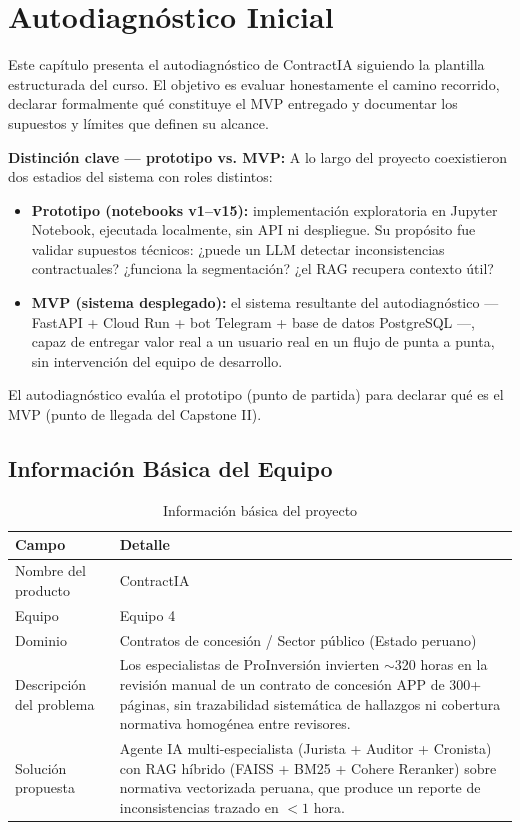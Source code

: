 \chapter{Autodiagnóstico Inicial}

Este capítulo presenta el autodiagnóstico de ContractIA siguiendo la plantilla
estructurada del curso. El objetivo es evaluar honestamente el camino recorrido,
declarar formalmente qué constituye el MVP entregado y documentar los supuestos
y límites que definen su alcance.

\medskip
\noindent\textbf{Distinción clave — prototipo vs. MVP:}
A lo largo del proyecto coexistieron dos estadios del sistema con roles distintos:

\begin{itemize}
    \item \textbf{Prototipo (notebooks v1–v15):} implementación exploratoria en
    Jupyter Notebook, ejecutada localmente, sin API ni despliegue. Su propósito
    fue validar supuestos técnicos: ¿puede un LLM detectar inconsistencias
    contractuales? ¿funciona la segmentación? ¿el RAG recupera contexto útil?
    \item \textbf{MVP (sistema desplegado):} el sistema resultante del
    autodiagnóstico — FastAPI + Cloud Run + bot Telegram + base de datos
    PostgreSQL —, capaz de entregar valor real a un usuario real en un flujo
    de punta a punta, sin intervención del equipo de desarrollo.
\end{itemize}

El autodiagnóstico evalúa el prototipo (punto de partida) para declarar qué
es el MVP (punto de llegada del Capstone II).

\section{Información Básica del Equipo}

\begin{table}[H]
\centering
\caption{Información básica del proyecto}
\label{tab:equipo}
\begin{tabular}{p{4cm} p{10cm}}
\toprule
\textbf{Campo} & \textbf{Detalle} \\
\midrule
Nombre del producto & ContractIA \\[4pt]
Equipo & Equipo 4 \\[4pt]
Dominio & Contratos de concesión / Sector público (Estado peruano) \\[4pt]
Descripción del problema &
  Los especialistas de ProInversión invierten $\sim$320 horas en la revisión
  manual de un contrato de concesión APP de 300+ páginas, sin trazabilidad
  sistemática de hallazgos ni cobertura normativa homogénea entre revisores. \\[4pt]
Solución propuesta &
  Agente IA multi-especialista (Jurista + Auditor + Cronista) con RAG híbrido
  (FAISS + BM25 + Cohere Reranker) sobre normativa vectorizada peruana, que
  produce un reporte de inconsistencias trazado en $<1$ hora. \\
\bottomrule
\end{tabular}
\end{table}

